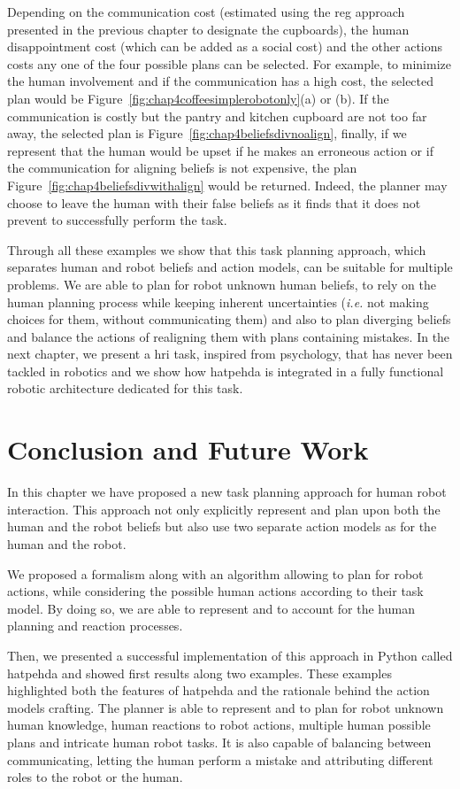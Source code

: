 \documentclass[a4paper,11pt,twoside]{StyleThese}
\begin{document}
Depending on the communication cost (estimated using the \acrshort{reg} approach presented in the previous chapter to designate the cupboards), the human disappointment cost (which can be added as a social cost) and the other actions costs any one of the four possible plans can be selected. For example, to minimize the human involvement and if the communication has a high cost, the selected plan would be Figure~\ref{fig:chap4coffeesimplerobotonly}(a) or (b). If the communication is costly but the pantry and kitchen cupboard are not too far away, the selected plan is Figure~\ref{fig:chap4beliefsdivnoalign}, finally, if we represent that the human would be upset if he makes an erroneous action or if the communication for aligning beliefs is not expensive, the plan Figure~\ref{fig:chap4beliefsdivwithalign} would be returned.
Indeed, the planner may choose to leave the human with their false beliefs as it finds that it does not prevent to successfully perform the task. 

Through all these examples we show that this task planning approach, which separates human and robot beliefs and action models, can be suitable for multiple problems. We are able to plan for robot unknown human beliefs, to rely on the human planning process while keeping inherent uncertainties (\textit{i.e.} not making choices for them, without communicating them) and also to plan diverging beliefs and balance the actions of realigning them with plans containing mistakes. In the next chapter, we present a \acrshort{hri} task, inspired from psychology, that has never been tackled in robotics and we show how \acrshort{hatpehda} is integrated in a fully functional robotic architecture dedicated for this task.

\section{Conclusion and Future Work}
In this chapter we have proposed a new task planning approach for human robot interaction. This approach not only explicitly represent and plan upon both the human and the robot beliefs but also use two separate action models as  for the human and the robot.

We proposed a formalism along with an algorithm allowing to plan for robot actions, while considering the possible human actions according to their task model. By doing so, we are able to represent and to account for the human planning and reaction processes.

Then, we presented a successful implementation of this approach in Python called \acrfull{hatpehda} and showed first results along two examples. These examples highlighted both the features of \acrshort{hatpehda} and the rationale behind the action models crafting. The planner is able to represent and to plan for robot unknown human knowledge, human reactions to robot actions, multiple human possible plans and intricate human robot tasks. It is also capable of balancing between communicating, letting the human perform a mistake and attributing different roles to the robot or the human.
\end{document}
